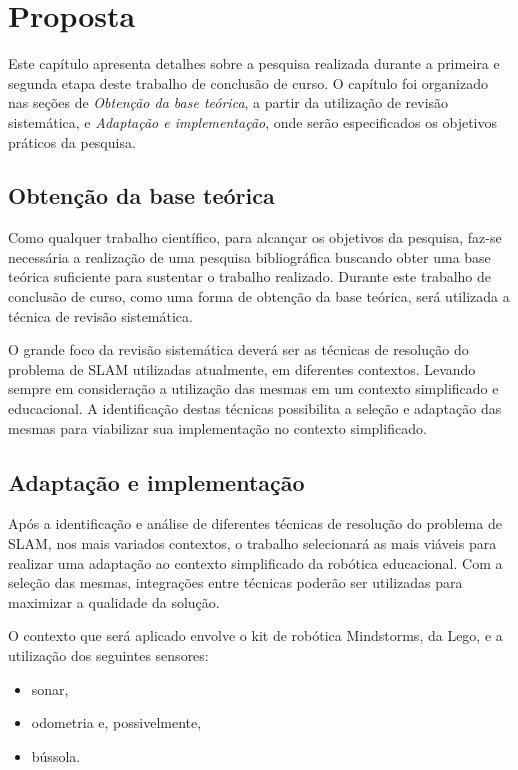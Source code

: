 \chapter[Proposta]{Proposta}

Este capítulo apresenta detalhes sobre a pesquisa realizada durante a primeira e segunda etapa deste trabalho de conclusão de curso. O capítulo foi organizado nas seções de \textit{Obtenção da base teórica}, a partir da utilização de revisão sistemática, e \textit{Adaptação e implementação}, onde serão especificados os objetivos práticos da pesquisa.

\section{Obtenção da base teórica} %
\label{sec:obtenção_da_base_teórica}
	
	Como qualquer trabalho científico, para alcançar os objetivos da pesquisa, faz-se necessária a realização de uma pesquisa bibliográfica buscando obter uma base teórica suficiente para sustentar o trabalho realizado. Durante este trabalho de conclusão de curso, como uma forma de obtenção da base teórica, será utilizada a técnica de revisão sistemática.

	O grande foco da revisão sistemática deverá ser as técnicas de resolução do problema de SLAM utilizadas atualmente, em diferentes contextos. Levando sempre em consideração a utilização das mesmas em um contexto simplificado e educacional. A identificação destas técnicas possibilita a seleção e adaptação das mesmas para viabilizar sua implementação no contexto simplificado.

\section{Adaptação e implementação} %
\label{sec:adaptação_e_implementação}

	Após a identificação e análise de diferentes técnicas de resolução do problema de SLAM, nos mais variados contextos, o trabalho selecionará as mais viáveis para realizar uma adaptação ao contexto simplificado da robótica educacional. 
	Com a seleção das mesmas, integrações entre técnicas poderão ser utilizadas para maximizar a qualidade da solução.

	O contexto que será aplicado envolve o kit de robótica Mindstorms, da Lego, e a utilização dos seguintes sensores:

	\begin{itemize}
		\item sonar,
		\item odometria e, possivelmente,
		\item bússola.
	\end{itemize}

